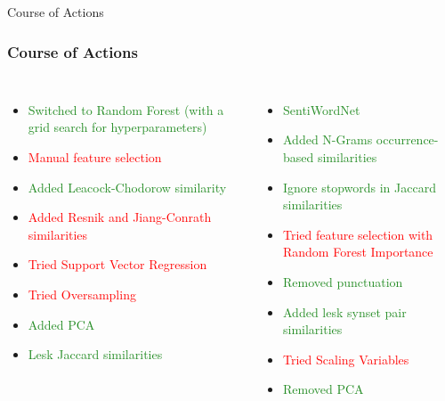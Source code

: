 \documentclass[usenames,dvipsnames]{beamer}
\begin{document}
\begin{frame}{Course of Actions}
    \frametitle{Course of Actions}
    \begin{columns}
        \begin{itemize}
            \item \textcolor{ForestGreen}{Switched to Random Forest (with a grid search for hyperparameters)}
            \pause
            \item \textcolor{red}{Manual feature selection}
            \pause
            \item \textcolor{ForestGreen}{Added Leacock-Chodorow similarity}
            \pause
            \item \textcolor{red}{Added Resnik and Jiang-Conrath similarities}
            \pause
            \item \textcolor{red}{Tried Support Vector Regression}
            \pause
            \item \textcolor{red}{Tried Oversampling}
            \pause
            \item \textcolor{ForestGreen}{Added PCA}
            \item \textcolor{ForestGreen}{Lesk Jaccard similarities}
            \pause
        \end{itemize}   
        \begin{itemize}
            \item \textcolor{ForestGreen}{SentiWordNet}
            \pause
            \item \textcolor{ForestGreen}{Added N-Grams occurrence-based similarities}
            \pause
            \item \textcolor{ForestGreen}{Ignore stopwords in Jaccard similarities}
            \pause
            \item \textcolor{red}{Tried feature selection with Random Forest Importance}
            \pause
            \item \textcolor{ForestGreen}{Removed punctuation}
            \pause
            \item \textcolor{ForestGreen}{Added lesk synset pair similarities}
            \pause
            \item \textcolor{red}{Tried Scaling Variables}
            \pause
            \item \textcolor{ForestGreen}{Removed PCA}
        \end{itemize}
    \end{columns}
\end{frame}
\end{document}
